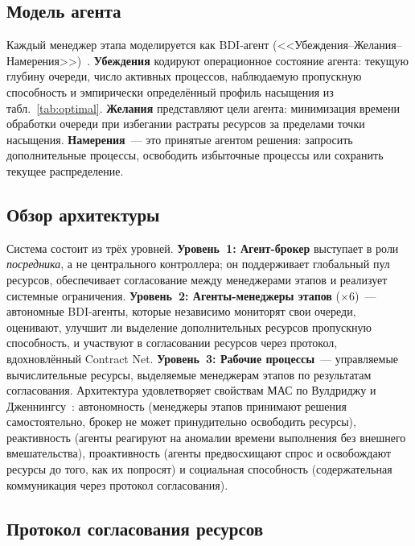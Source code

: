 \documentclass[conference]{IEEEtran}
\begin{document}
\subsection{Модель агента}

Каждый менеджер этапа моделируется как BDI-агент (<<Убеждения--Желания--Намерения>>)~\cite{wooldridge1995}. \textbf{Убеждения} кодируют операционное состояние агента: текущую глубину очереди, число активных процессов, наблюдаемую пропускную способность и эмпирически определённый профиль насыщения из табл.~\ref{tab:optimal}. \textbf{Желания} представляют цели агента: минимизация времени обработки очереди при избегании растраты ресурсов за пределами точки насыщения. \textbf{Намерения}~--- это принятые агентом решения: запросить дополнительные процессы, освободить избыточные процессы или сохранить текущее распределение.

\subsection{Обзор архитектуры}

Система состоит из трёх уровней. \textbf{Уровень~1: Агент-брокер} выступает в роли \textit{посредника}, а не центрального контроллера; он поддерживает глобальный пул ресурсов, обеспечивает согласование между менеджерами этапов и реализует системные ограничения. \textbf{Уровень~2: Агенты-менеджеры этапов} ($\times$6)~--- автономные BDI-агенты, которые независимо мониторят свои очереди, оценивают, улучшит ли выделение дополнительных ресурсов пропускную способность, и участвуют в согласовании ресурсов через протокол, вдохновлённый Contract Net. \textbf{Уровень~3: Рабочие процессы}~--- управляемые вычислительные ресурсы, выделяемые менеджерам этапов по результатам согласования. Архитектура удовлетворяет свойствам МАС по Вулдриджу и Дженнингсу~\cite{wooldridge1995}: автономность (менеджеры этапов принимают решения самостоятельно, брокер не может принудительно освободить ресурсы), реактивность (агенты реагируют на аномалии времени выполнения без внешнего вмешательства), проактивность (агенты предвосхищают спрос и освобождают ресурсы до того, как их попросят) и социальная способность (содержательная коммуникация через протокол согласования).

\subsection{Протокол согласования ресурсов}
\end{document}
